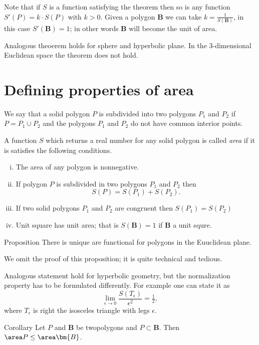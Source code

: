 Note that if $S$ is a function satisfying the theorem then so is any function $S'(P)=k\cdot S(P)$ with $k>0$.
Given a polygon $\bm{B}$ we can take $k=\tfrac{1}{S(\bm{B})}$,
in this case $S'(\bm{B})=1$;
in other words $\bm{B}$ will become the unit of area.

Analogous theoerem holds for sphere and hyperbolic plane.
In the $3$-dimensional Euclidean space the theorem does not hold.


\section*{Defining properties of area}

We say that a solid polygon $P$ is subdivided 
into two polygons $P_1$ and $P_2$ 
if $P=P_1\cup P_2$ 
and the polygons $P_1$ and $P_2$ do not have common interior points. 

A function $S$ 
which returns a real number for any solid polygon is called \emph{area}
if it is satisfies the following conditions.

\begin{enumerate}[(i)]
\item\label{area:positive} The area of any polygon is nonnegative.
\item\label{area:additive} If polygon $P$ is subdivided in two polygons $P_1$ and $P_2$ then 
\[S(P)=S(P_1)+S(P_2).\]
\item\label{area:equal} If two solid polygons $P_1$ and $P_2$ are congruent then $S(P_1)=S(P_2)$
\item\label{area:unit} Unit square has unit area; that is $S(\bm{B})=1$ if $\bm{B}$ a unit squre.
\end{enumerate}


\begin{thm}{Proposition}
There is unique are functional for polygons in the Euuclidean plane. 
\end{thm}

We omit the proof of this proposition;
it is quite technical and tedious. 

Analogous statement hold for hyperbolic geometry, but the normalization property has to be formulated differently.
For example one can state it as 
\[\lim_{\epsilon\to0}\frac{S(T_\epsilon)}{\epsilon^2}=\tfrac12,\]
where 
$T_\epsilon$ is right the isosceles triangle with legs $\epsilon$.


\begin{thm}{Corollary}
Let $P$ and $\bm{B}$ be twopolygons and $P\subset \bm{B}$.
Then $\area P\le \area \bm{B}$.
\end{thm}

